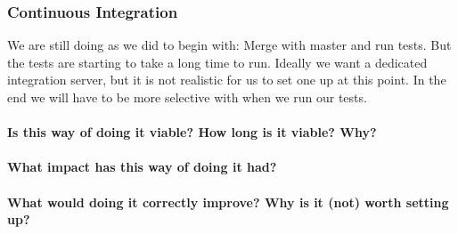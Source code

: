 \subsubsection{Continuous Integration}
We are still doing as we did to begin with: Merge with master and run tests. But the tests are starting to take a long time to run. Ideally we want a dedicated integration server, but it is not realistic for us to set one up at this point. In the end we will have to be more selective with when we run our tests.

\paragraph{Is this way of doing it viable? How long is it viable? Why?}

\paragraph{What impact has this way of doing it had?}

\paragraph{What would doing it correctly improve? Why is it (not) worth setting up?}
